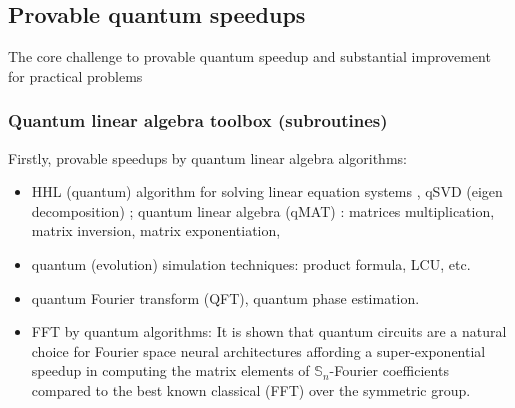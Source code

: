 \subsection{Provable quantum speedups}
The core challenge to provable quantum speedup and substantial improvement for practical problems

\subsubsection{Quantum linear algebra toolbox (subroutines)}
Firstly, provable speedups by quantum linear algebra algorithms:
\begin{itemize}
	\item HHL (quantum) algorithm for solving linear equation systems \cite{harrowQuantumAlgorithmSolving2009}, qSVD (eigen decomposition) \cite{gilyenQuantumSingularValue2019}; 
	quantum linear algebra (qMAT) \cite{zhaoCompilingBasicLinear2019}: matrices multiplication, matrix inversion, matrix exponentiation, 

	\item quantum (evolution) simulation techniques: product formula, LCU, etc.

	\item quantum Fourier transform (QFT), quantum phase estimation.

	\item FFT by quantum algorithms: 
	It is shown that quantum circuits are a natural choice for Fourier space neural architectures affording a super-exponential speedup in computing the matrix elements of $\mathbb{S}_n$-Fourier coefficients compared to the best known classical (FFT) over the symmetric group. \cite{zhengSpeedingLearningQuantum2022}
	\cite{kondorGraphletSpectrum2009}
\end{itemize}

